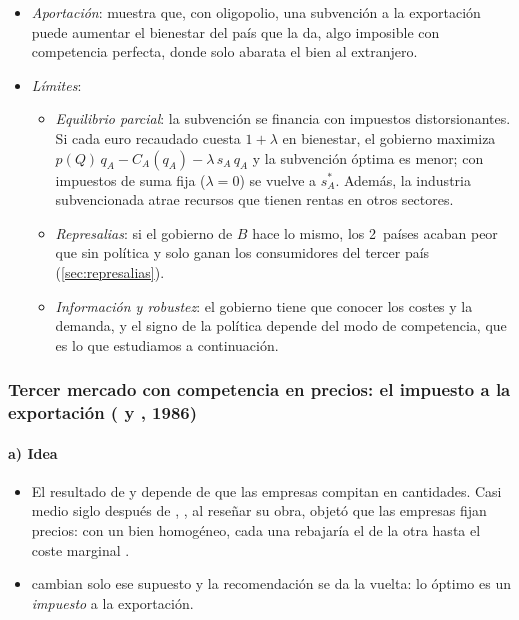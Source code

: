 \documentclass[11pt]{article}
\begin{document}
\begin{itemize}
\item \emph{Aportación}: muestra que, con oligopolio, una subvención a la exportación puede aumentar el bienestar del país que la da, algo imposible con competencia perfecta, donde solo abarata el bien al extranjero.
\item \emph{Límites}:
  \begin{itemize}
  \item \emph{Equilibrio parcial}: la subvención se financia con impuestos distorsionantes. Si cada euro recaudado cuesta $1+\lambda$ en bienestar, el gobierno maximiza $p(Q)\,q_A-C_A(q_A)-\lambda\,s_A\,q_A$ y la subvención óptima es menor; con impuestos de suma fija ($\lambda=0$) se vuelve a $s_A^*$. Además, la industria subvencionada atrae recursos que tienen rentas en otros sectores.
  \item \emph{Represalias}: si el gobierno de $B$ hace lo mismo, los 2~países acaban peor que sin política y solo ganan los consumidores del tercer país (\ref{sec:represalias}).
  \item \emph{Información y robustez}: el gobierno tiene que conocer los costes y la demanda, y el signo de la política depende del modo de competencia, que es lo que estudiamos a continuación.
  \end{itemize}
\end{itemize}

\subsubsection{Tercer mercado con competencia en precios: el impuesto a la exportación ( y , 1986)}\label{sec:eaton-grossman}

\paragraph{a) Idea}

\begin{itemize}
\item El resultado de  y  depende de que las empresas compitan en cantidades. Casi medio siglo después de \textcite{Cournot1838Recherches}, \textcite{Bertrand1883Theorie}, al reseñar su obra, objetó que las empresas fijan precios: con un bien homogéneo, cada una rebajaría el de la otra hasta el coste marginal .
\item \textcite{EatonGrossman1986Optimal} cambian solo ese supuesto y la recomendación se da la vuelta: lo óptimo es un \emph{impuesto} a la exportación.
\end{itemize}
\end{document}
